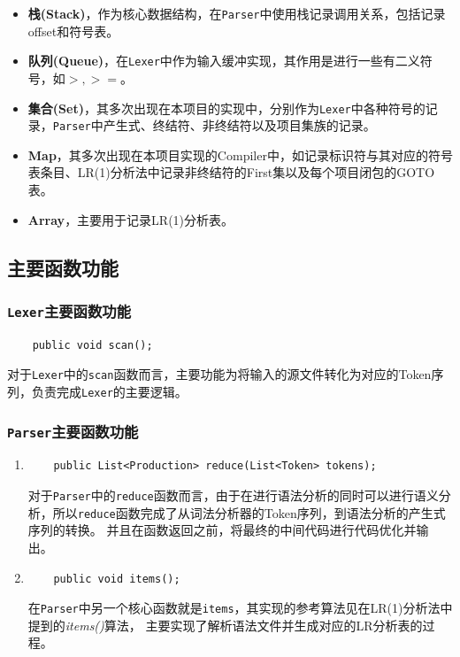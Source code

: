 \documentclass{ML}
\begin{document}
\begin{itemize}
    \item \textbf{栈(Stack)}，作为核心数据结构，在\texttt{Parser}中使用栈记录调用关系，包括记录offset和符号表。
    \item \textbf{队列(Queue)}，在\texttt{Lexer}中作为输入缓冲实现，其作用是进行一些有二义符号，如$>, >=$。
    \item \textbf{集合(Set)}，其多次出现在本项目的实现中，分别作为\texttt{Lexer}中各种符号的记录，\texttt{Parser}中产生式、终结符、非终结符以及项目集族的记录。
    \item \textbf{Map}，其多次出现在本项目实现的Compiler中，如记录标识符与其对应的符号表条目、LR(1)分析法中记录非终结符的First集以及每个项目闭包的GOTO表。
    \item \textbf{Array}，主要用于记录LR(1)分析表。
\end{itemize}

\subsection{主要函数功能}

\subsubsection{\texttt{Lexer}主要函数功能}

\begin{verbatim}
    public void scan();
\end{verbatim}

对于\texttt{Lexer}中的\texttt{scan}函数而言，主要功能为将输入的源文件转化为对应的Token序列，负责完成\texttt{Lexer}的主要逻辑。

\subsubsection{\texttt{Parser}主要函数功能}
\begin{enumerate}
    
    \item \begin{verbatim}
    public List<Production> reduce(List<Token> tokens);
    \end{verbatim}
    
    对于\texttt{Parser}中的\texttt{reduce}函数而言，由于在进行语法分析的同时可以进行语义分析，所以\texttt{reduce}函数完成了从词法分析器的Token序列，到语法分析的产生式序列的转换。
    并且在函数返回之前，将最终的中间代码进行代码优化并输出。

    \item \begin{verbatim}
    public void items();
    \end{verbatim}

    在\texttt{Parser}中另一个核心函数就是\texttt{items}，其实现的参考算法见\cite{dragon-book}在LR(1)分析法中提到的\textit{items()}算法，
    主要实现了解析语法文件并生成对应的LR分析表的过程。
\end{enumerate}
\end{document}
